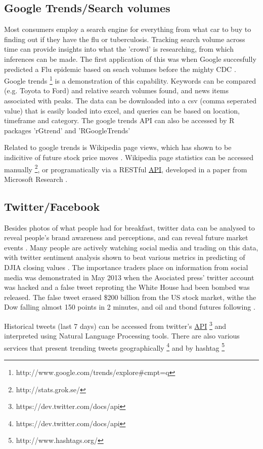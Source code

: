 \documentclass[11pt]{article}
\begin{document}
	\subsection{Google Trends/Search volumes}
	Most consumers employ a search engine for everything from what car to buy to finding out if they have the flu or tuberculosis.
	Tracking search volume across time can provide insights into what the 'crowd' is researching, from which inferences can be made.
	The first application of this was when Google succesfully predicted a Flu epidemic based on seach volumes before the mighty CDC\cite{Ginsberg2009} .
	Google trends \footnote{http://www.google.com/trends/explore\#cmpt=q} is a demonstration of this capability. 
	Keywords can be compared (e.g. Toyota to Ford) and relative search volumes found, and news items associated with peaks. 
	The data can be downloaded into a csv (comma seperated value) that is easily loaded into excel, and queries can be based on location, timeframe and category.
	The google trends API can also be accessed by R packages 'rGtrend' and 'RGoogleTrends'
		

	Related to google trends is Wikipedia page views, which has shown to be indicitive of future stock price moves \cite{Moat2013}.
	Wikipedia page statistics can be accessed manually \footnote{http://stats.grok.se/}, or programatically via a RESTful \hyperref[api]{API}, developed in a paper from Microsoft Research \cite{Peetz}. 

	\subsection{Twitter/Facebook}
	Besides photos of what people had for breakfast, twitter data can be analysed to reveal people's brand awareness and perceptions, and can reveal future market events \cite{Ruiz2012}.
	Many people are actively watching social media and trading on this data, with twitter sentiment analysis shown to beat various metrics in predicting of DJIA closing values \cite{Bollen2011}.
	The importance traders place on information from social media was demonstrated in May 2013 when the Asociated press' twitter account was hacked and a false tweet reproting the White House had been bombed was released. 
	The false tweet erased \$200 billion from the US stock market, withe the Dow falling almost 150  points in 2 minutes, and oil and tbond futures following \cite{wsj13}. 

	Historical tweets (last 7 days) can be accessed from twitter's \hyperref[api]{API} \footnote{https://dev.twitter.com/docs/api} and interpreted using Natural Language Processing tools.
	There are also various services that present trending tweets geographically \footnote{https://dev.twitter.com/docs/api}  and by hashtag \footnote{http://www.hashtags.org/}
\end{document}
